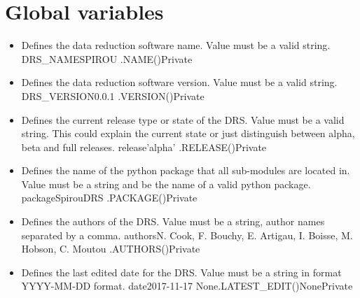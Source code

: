 \fi





\section{Global variables}
\label{ch:variables:global}


\begin{itemize}
\ifdevguide
\item \label{text:drs_name} 
{Defines the data reduction software name. Value must be a valid string.}
{DRS\_NAME}{SPIROU}
{\AllRecipes}{\spirouConst.NAME()}{\AllRecipes}{Private}
\fi

\ifdevguide
\item \label{text:drs_version} 
{Defines the data reduction software version. Value must be a valid string.}
{DRS\_VERSION}{0.0.1}
{\AllRecipes}{\spirouConst.VERSION()}{\AllRecipes}{Private}
\fi


\ifdevguide
\item {}
{Defines the current release type or state of the DRS. Value must be a valid string. This could explain the current state or just distinguish between alpha, beta and full releases.}
{release}{'alpha'}
{\AllRecipes}{\spirouConst.RELEASE()}{\AllRecipes}{Private}
\fi

\ifdevguide
\item {}
{Defines the name of the python package that all sub-modules are located in. Value must be a string and be the name of a valid python package.}
{package}{SpirouDRS}
{\AllRecipes}{\spirouConst.PACKAGE()}{\AllRecipes}{Private}
\fi

\ifdevguide
\item {}
{Defines the authors of the DRS. Value must be a string, author names separated by a comma.}
{authors}{N. Cook, F. Bouchy, E. Artigau, I. Boisse, M. Hobson, C. Moutou}
{\AllRecipes}{\spirouConst.AUTHORS()}{\AllRecipes}{Private}
\fi


\ifdevguide
\item {}
{Defines the last edited date for the DRS. Value must be a string in format YYYY-MM-DD format.}
{date}{2017-11-17}
{None}{\spirouConst.LATEST\_EDIT()}{None}{Private}
\fi



\end{itemize}
